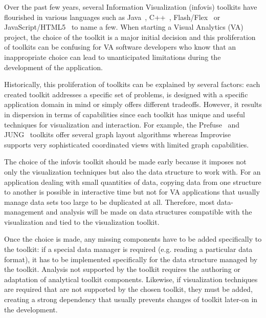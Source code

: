 
Over the past few years, several Information Visualization (infovis)
toolkits have flourished in various languages such as
Java~\cite{InfoVis, Prefuse, jung2003, Improvise,Discovery2},
C++~\cite{Tulip,ADVIZOR}, Flash/Flex~\cite{flare,Axiis} or
JavaScript/HTML5~\cite{thejit,Protovis} to name a few.  When starting
a Visual Analytics (VA) project, the choice of the toolkit is a major
initial decision and this proliferation of toolkits can be confusing
for VA software developers who know that an
inappropriate choice can lead to unanticipated limitations during the
development of the application.

Historically, this proliferation of toolkits can be explained by
several factors: each created toolkit addresses a specific set of
problems, is designed with a specific application domain in mind or
simply offers different tradeoffs.  However, it results in dispersion
in terms of capabilities since each toolkit has unique and useful
techniques for visualization and interaction.  For example, the
Prefuse~\cite{Prefuse} and JUNG~\cite{jung2003} toolkits offer several
graph layout algorithms whereas Improvise~\cite{Improvise} supports
very sophisticated coordinated views with limited graph capabilities.

The choice of the infovis toolkit should be made
early because it imposes not only the visualization techniques but
also the data structure to work with.  For an application dealing with
small quantities of data, copying data from one structure to another
is possible in interactive time but not for VA
applications that usually manage data sets too large to be duplicated
at all.  Therefore, most data-management and analysis will be made on
data structures compatible with the visualization and tied to the
visualization toolkit.


Once the choice is made, any missing components have to be added
specifically to the toolkit: if a special data manager is required
(e.g. reading a particular data format), it has to be implemented
specifically for the data structure managed by the toolkit. Analysis
not supported by the toolkit requires the authoring or adaptation of
analytical toolkit components. Likewise, if visualization techniques
are required that are not supported by the chosen toolkit, they must
be added, creating a strong dependency that usually prevents changes
of toolkit later-on in the development.

